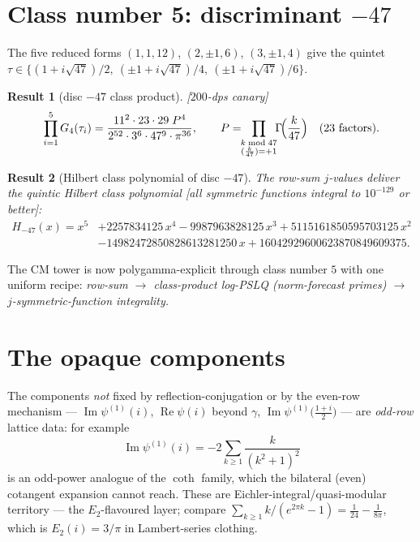 \documentclass[11pt]{article}
\newtheorem{result}{Result}[section]
\theoremstyle{remark}
\newcommand{\dps}[1]{\textsf{\footnotesize[#1]}}
\begin{document}
\section{Class number 5: discriminant \texorpdfstring{$-47$}{-47}}\label{sec:h5}

The five reduced forms $(1,1,12)$, $(2,\pm1,6)$, $(3,\pm1,4)$ give the quintet
$\tau\in\{(1+i\sqrt{47})/2,\ (\pm1+i\sqrt{47})/4,\ (\pm1+i\sqrt{47})/6\}$.

\begin{result}[disc $-47$ class product]\label{res:d47}
\dps{$200$-dps canary}
\[
\prod_{i=1}^{5}G_4(\tau_i)
=\frac{11^2\cdot23\cdot29\;P^4}{2^{52}\cdot3^{6}\cdot47^{9}\cdot\pi^{36}},\qquad
P=\!\!\prod_{\substack{k\bmod 47\\ (\frac{k}{47})=+1}}\!\!\Gamma\!\Bigl(\frac{k}{47}\Bigr)
\quad\text{(23 factors)}.
\]
\end{result}

\begin{result}[Hilbert class polynomial of disc $-47$]\label{res:H47}
The row-sum $j$-values deliver the quintic Hilbert class polynomial
\dps{all symmetric functions integral to $10^{-129}$ or better}:
\begin{align*}
H_{-47}(x)=x^5&+2257834125\,x^4-9987963828125\,x^3+5115161850595703125\,x^2\\
&-14982472850828613281250\,x+16042929600623870849609375 .
\end{align*}
\end{result}

The CM tower is now polygamma-explicit through class number $5$ with one uniform recipe:
\emph{row-sum $\to$ class-product log-PSLQ (norm-forecast primes) $\to$
$j$-symmetric-function integrality.}

\section{The opaque components}\label{sec:opaque}

The components \emph{not} fixed by reflection-conjugation or by the even-row mechanism ---
$\operatorname{Im}\psi^{(1)}(i)$, $\operatorname{Re}\psi(i)$ beyond $\gamma$,
$\operatorname{Im}\psi^{(1)}\bigl(\tfrac{1+i}{2}\bigr)$ --- are \emph{odd-row} lattice data:
for example
\[
\operatorname{Im}\psi^{(1)}(i)=-2\sum_{k\ge1}\frac{k}{(k^2+1)^2}
\]
is an odd-power analogue of the $\coth$ family, which the bilateral (even) cotangent
expansion cannot reach. These are Eichler-integral/quasi-modular territory --- the
$E_2$-flavoured layer; compare $\sum_{k\ge1}k/(e^{2\pi k}-1)=\tfrac1{24}-\tfrac1{8\pi}$,
which is $E_2(i)=3/\pi$ in Lambert-series clothing.
\end{document}

